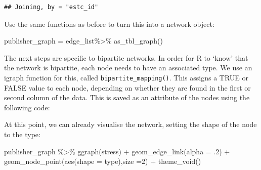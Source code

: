 \documentclass[
]{book}
\newenvironment{Shaded}{\begin{snugshade}}{\end{snugshade}}
\newcommand{\AttributeTok}[1]{\textcolor[rgb]{0.77,0.63,0.00}{#1}}
\newcommand{\DecValTok}[1]{\textcolor[rgb]{0.00,0.00,0.81}{#1}}
\newcommand{\FunctionTok}[1]{\textcolor[rgb]{0.00,0.00,0.00}{#1}}
\newcommand{\NormalTok}[1]{#1}
\newcommand{\OtherTok}[1]{\textcolor[rgb]{0.56,0.35,0.01}{#1}}
\newcommand{\SpecialCharTok}[1]{\textcolor[rgb]{0.00,0.00,0.00}{#1}}
\newcommand{\StringTok}[1]{\textcolor[rgb]{0.31,0.60,0.02}{#1}}
\begin{document}
\begin{verbatim}
## Joining, by = "estc_id"
\end{verbatim}

Use the same functions as before to turn this into a network object:

\begin{Shaded}
\begin{Highlighting}[]
\NormalTok{publisher\_graph  }\OtherTok{=}\NormalTok{ edge\_list}\SpecialCharTok{\%\textgreater{}\%} \FunctionTok{as\_tbl\_graph}\NormalTok{()}
\end{Highlighting}
\end{Shaded}

The next steps are specific to bipartite networks. In order for R to `know' that the network is bipartite, each node needs to have an associated type. We use an igraph function for this, called \texttt{bipartite\_mapping()}. This assigns a TRUE or FALSE value to each node, depending on whether they are found in the first or second column of the data. This is saved as an attribute of the nodes using the following code:

\begin{Shaded}
\end{Shaded}

At this point, we can already visualise the network, setting the shape of the node to the type:

\begin{Shaded}
\begin{Highlighting}[]
\NormalTok{publisher\_graph }\SpecialCharTok{\%\textgreater{}\%} 
  \FunctionTok{ggraph}\NormalTok{(}\StringTok{\textquotesingle{}stress\textquotesingle{}}\NormalTok{) }\SpecialCharTok{+}
  \FunctionTok{geom\_edge\_link}\NormalTok{(}\AttributeTok{alpha =}\NormalTok{ .}\DecValTok{2}\NormalTok{) }\SpecialCharTok{+} 
  \FunctionTok{geom\_node\_point}\NormalTok{(}\FunctionTok{aes}\NormalTok{(}\AttributeTok{shape =}\NormalTok{ type),}\AttributeTok{size =}\DecValTok{2}\NormalTok{) }\SpecialCharTok{+} 
  \FunctionTok{theme\_void}\NormalTok{()}
\end{Highlighting}
\end{Shaded}
\end{document}
